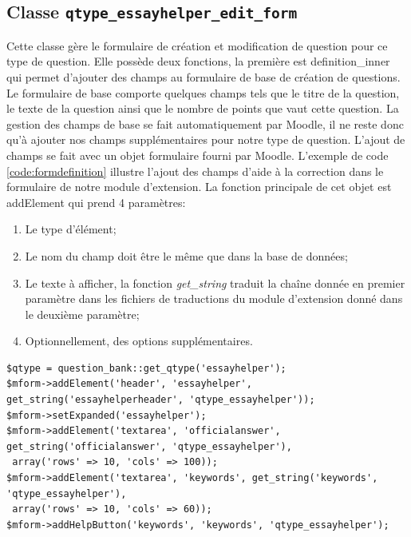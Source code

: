 \subsection*{Classe \texttt{qtype\_essayhelper\_edit\_form}}
Cette classe g\`ere le formulaire de cr\'eation et modification de question pour ce type de question.
Elle poss\`ede deux fonctions, la premi\`ere est \og definition\_inner \fg{} qui permet d'ajouter des champs au formulaire de base de cr\'eation de questions.
Le formulaire de base comporte quelques champs tels que le titre de la question, le texte de la question ainsi que le nombre de points que vaut cette question.
La gestion des champs de base se fait automatiquement par Moodle, il ne reste donc qu'\`a ajouter nos champs suppl\'ementaires pour notre type de question.
L'ajout de champs se fait avec un objet formulaire fourni par Moodle.
L'exemple de code \ref{code:formdefinition} illustre l'ajout des champs d'aide \`a la correction dans le formulaire de notre module d'extension.
La fonction principale de cet objet est addElement qui prend 4 param\`etres:
\begin{enumerate}
  \item Le type d'\'el\'ement;
  \item Le nom du champ doit \^etre le m\^eme que dans la base de donn\'ees;
  \item Le texte \`a afficher, la fonction \textit{get\_string} traduit la cha\^ine donn\'ee en premier param\`etre dans les fichiers de traductions du module d'extension donn\'e dans le deuxi\`eme param\`etre;
  \item Optionnellement, des options suppl\'ementaires.
\end{enumerate}
\begin{lstfloat}
\begin{lstlisting}[frame=l]
$qtype = question_bank::get_qtype('essayhelper');
$mform->addElement('header', 'essayhelper', get_string('essayhelperheader', 'qtype_essayhelper'));
$mform->setExpanded('essayhelper');
$mform->addElement('textarea', 'officialanswer', get_string('officialanswer', 'qtype_essayhelper'),
 array('rows' => 10, 'cols' => 100));
$mform->addElement('textarea', 'keywords', get_string('keywords', 'qtype_essayhelper'),
 array('rows' => 10, 'cols' => 60));
$mform->addHelpButton('keywords', 'keywords', 'qtype_essayhelper');
\end{lstlisting}
\caption{Extrait du code de la fonction definition\_inner de la classe qtype\_essayhelper\_edit\_form.}
\label{code:formdefinition}
\end{lstfloat}
